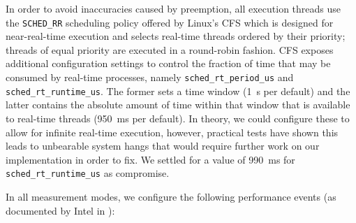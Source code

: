 In order to avoid inaccuracies caused by preemption, all execution threads use the \texttt{SCHED\_RR} scheduling policy offered by Linux's \gls{CFS} \cite{cfs} which is designed for near-real-time execution and selects real-time threads ordered by their priority; threads of equal priority are executed in a round-robin fashion. \gls{CFS} exposes additional configuration settings \cite{cfsrt} to control the fraction of time that may be consumed by real-time processes, namely \texttt{sched\_rt\_period\_us} and \texttt{sched\_rt\_runtime\_us}. The former sets a time window (\SI{1}{\second} per default) and the latter contains the absolute amount of time within that window that is available to real-time threads (\SI{950}{\milli\second} per default). In theory, we could configure these to allow for infinite real-time execution, however, practical tests have shown this leads to unbearable system hangs that would require further work on our implementation in order to fix. We settled for a value of \SI{990}{\milli\second} for \texttt{sched\_rt\_runtime\_us} as compromise.

In all measurement modes, we configure the following performance events (as documented by Intel in \cite{intelsdmsysprogguide}):

